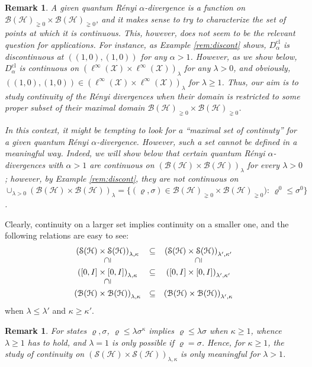 \documentclass[unsortedaddress,superscriptaddress,pra,notitlepage]{revtex4}
\newtheorem{rem}[definition]{Remark}
\def\B{{\mathcal B}}
\def\S{{\mathcal S}}
\def\X{{\mathcal X}}
\def\rho{\varrho}
\def\hil{{\mathcal H}}
\def\bz{\left(}
\def\jz{\right)}
\def\pne{_{\gneq 0}}
\def\cl{\mathrm{cl}}
\def\cl{\mathrm{cl}}
\def\pwr{\kappa}
\newcommand{\vertcont}{\rotatebox{90}{$\,\supseteq$}}
\begin{document}
\begin{rem}
A given quantum R\'enyi $\alpha$-divergence is a function on 
$\B(\hil)\pne\times\B(\hil)\pne$, and it makes sense to try to characterize the set of points 
at which it is continuous. This, however, does not seem to be the relevant question for 
applications. For instance, as Example \ref{rem:discont} shows, $D_{\alpha}^{\cl}$ is 
discontinuous at $((1,0),(1,0))$ for any $\alpha>1$.
However, as we show below, $D_{\alpha}^{\cl}$ is continuous on 
$(\ell^{\infty}(\X)\times\ell^{\infty}(\X))_{\lambda}$ for any $\lambda>0$, and obviously,
$((1,0),(1,0))\in(\ell^{\infty}(\X)\times\ell^{\infty}(\X))_{\lambda}$ for $\lambda\ge 1$.
Thus, our aim is to study continuity of the R\'enyi divergences when their domain is 
restricted to some proper subset of their maximal domain $\B(\hil)\pne\times\B(\hil)\pne$.

In this context, 
it might be tempting to look for a ``maximal set of continuty'' for a given quantum 
R\'enyi $\alpha$-divergence. However, such a set cannot be defined in a meaningful way. 
Indeed, we will show below that certain quantum 
R\'enyi $\alpha$-divergences with $\alpha>1$ are continuous on 
$\bz\B(\hil)\times\B(\hil)\jz_{\lambda}$ for every $\lambda>0$; however, by 
Example \ref{rem:discont}, they are not continuous
on $\cup_{\lambda>0}\bz\B(\hil)\times\B(\hil)\jz_{\lambda}=\{(\rho,\sigma)\in\B(\hil)\pne\times\B(\hil)\pne):\,\rho^0\le\sigma^0\}$.
\end{rem}

Clearly, continuity on a larger set implies continuity on a smaller one, and the following relations are easy to see:
\begin{align}\label{containmnets}
\begin{array}{ccc}
\bz\S(\hil)\times\S(\hil)\jz_{\lambda,\pwr}&\subseteq &
\bz\S(\hil)\times\S(\hil)\jz_{\lambda',\pwr'}\\
\vertcont & & \vertcont \\
\bz[0,I]\times[0,I]\jz_{\lambda,\pwr}&\subseteq &\bz[0,I]\times[0,I]\jz_{\lambda',\pwr'}\\
\vertcont & &  \\
\bz\B(\hil)\times\B(\hil)\jz_{\lambda,\pwr}&\subseteq &
\bz\B(\hil)\times\B(\hil)\jz_{\lambda',\pwr}
\end{array}
\end{align}
when $\lambda\le\lambda'$ and $\kappa\ge\kappa'$.

\begin{rem}
For states $\rho,\sigma$, $\rho\le\lambda\sigma^{\pwr}$ 
implies $\rho\le\lambda\sigma$ when $\pwr\ge 1$, whence
$\lambda\ge 1$ has to hold, and
$\lambda=1$ is only possible if $\rho=\sigma$. 
Hence, for $\pwr\ge 1$, the study of continuity on 
$\bz\S(\hil)\times\S(\hil)\jz_{\lambda,\pwr}$ is only meaningful for $\lambda>1$.
\end{rem}
\end{document}
